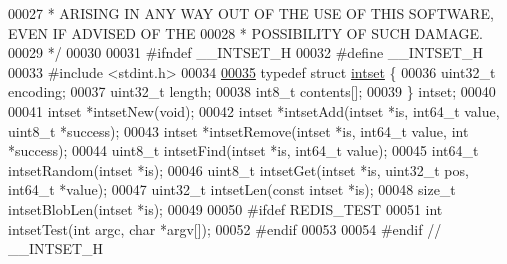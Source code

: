 \begin{DoxyCode}
00027 \textcolor{comment}{ * ARISING IN ANY WAY OUT OF THE USE OF THIS SOFTWARE, EVEN IF ADVISED OF THE}
00028 \textcolor{comment}{ * POSSIBILITY OF SUCH DAMAGE.}
00029 \textcolor{comment}{ */}
00030 
00031 \textcolor{preprocessor}{#}\textcolor{preprocessor}{ifndef} \textcolor{preprocessor}{\_\_INTSET\_H}
00032 \textcolor{preprocessor}{#}\textcolor{preprocessor}{define} \textcolor{preprocessor}{\_\_INTSET\_H}
00033 \textcolor{preprocessor}{#}\textcolor{preprocessor}{include} \textcolor{preprocessor}{<}\textcolor{preprocessor}{stdint}\textcolor{preprocessor}{.}\textcolor{preprocessor}{h}\textcolor{preprocessor}{>}
00034 
\hyperlink{structintset}{00035} \textcolor{keyword}{typedef} \textcolor{keyword}{struct} \hyperlink{structintset}{intset} \{
00036     uint32\_t encoding;
00037     uint32\_t length;
00038     int8\_t contents[];
00039 \} intset;
00040 
00041 intset *intsetNew(\textcolor{keywordtype}{void});
00042 intset *intsetAdd(intset *is, int64\_t value, uint8\_t *success);
00043 intset *intsetRemove(intset *is, int64\_t value, \textcolor{keywordtype}{int} *success);
00044 uint8\_t intsetFind(intset *is, int64\_t value);
00045 int64\_t intsetRandom(intset *is);
00046 uint8\_t intsetGet(intset *is, uint32\_t pos, int64\_t *value);
00047 uint32\_t intsetLen(\textcolor{keyword}{const} intset *is);
00048 size\_t intsetBlobLen(intset *is);
00049 
00050 \textcolor{preprocessor}{#}\textcolor{preprocessor}{ifdef} \textcolor{preprocessor}{REDIS\_TEST}
00051 \textcolor{keywordtype}{int} intsetTest(\textcolor{keywordtype}{int} argc, \textcolor{keywordtype}{char} *argv[]);
00052 \textcolor{preprocessor}{#}\textcolor{preprocessor}{endif}
00053 
00054 \textcolor{preprocessor}{#}\textcolor{preprocessor}{endif} \textcolor{comment}{// \_\_INTSET\_H}
\end{DoxyCode}
